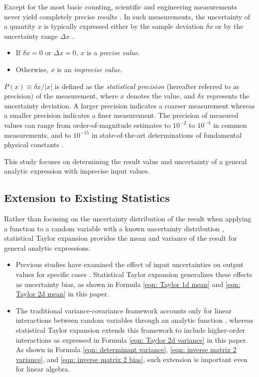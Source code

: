 \documentclass[twoside]{article}
\numberwithin{equation}{section}
\begin{document}
Except for the most basic counting, scientific and engineering measurements never yield completely precise results \cite{Statistical_Methods}\cite{Precisions_Physical_Measurements}. 
In such measurements, the uncertainty of a quantity $x$ is typically expressed either by the sample deviation $\delta x$ or by the uncertainty range $\Delta x$ \cite{Statistical_Methods}\cite{Precisions_Physical_Measurements}.
\begin{itemize}
\item If $\delta x = 0$ or $\Delta x = 0$, $x$ is a \emph{precise value}.

\item Otherwise, $x$ is an \emph{imprecise value}.
\end{itemize}
 
$P(x) \equiv \delta x / |x|$ is defined as the \emph{statistical precision} (hereafter referred to as precision) of the measurement, where $x$ denotes the value, and $\delta x$ represents the uncertainty deviation.
A larger precision indicates a coarser measurement whereas a smaller precision indicates a finer measurement.
The precision of measured values can range from order-of-magnitude estimates to $10^{-2}$ to $10^{-4}$ in common measurements, and to $10^{-15}$ in state-of-the-art determinations of fundamental physical constants \cite{Basic_Constants_Measurements}. 

This study focuses on determining the result value and uncertainty of a general analytic expression with imprecise input values. 



\subsection{Extension to Existing Statistics}

Rather than focusing on the uncertainty distribution of the result when applying a function to a random variable with a known uncertainty distribution \cite{Probability_Statistics}, statistical Taylor expansion provides the mean and variance of the result for general analytic expressions.
\begin{itemize}
\item 
Previous studies have examined the effect of input uncertainties on output values for specific cases \cite{Lower_Order_Variance_Expansion}.
Statistical Taylor expansion generalizes these effects as uncertainty bias, as shown in Formula \eqref{eqn: Taylor 1d mean} and \eqref{eqn: Taylor 2d mean} in this paper.

\item
The traditional variance-covariance framework accounts only for linear interactions between random variables through an analytic function \cite{Probability_Statistics}\cite{Lower_Order_Variance_Expansion}, whereas statistical Taylor expansion extends this framework to include higher-order interactions as expressed in Formula \eqref{eqn: Taylor 2d variance} in this paper.
As shown in Formula \eqref{eqn: determinant variance}, \eqref{eqn: inverse matrix 2 variance}, and \eqref{eqn: inverse matrix 2 bias}, such extension is important even for linear algebra.
 
\end{itemize}
\end{document}
